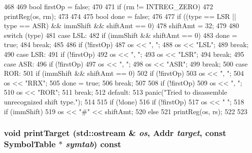\begin{DoxyCode}
468 {
469     bool firstOp = false;
470 
471     if (rm != INTREG_ZERO) {
472         printReg(os, rm);
473     }
474 
475     bool done = false;
476 
477     if ((type == LSR || type == ASR) && immShift && shiftAmt == 0)
478         shiftAmt = 32;
479 
480     switch (type) {
481       case LSL:
482         if (immShift && shiftAmt == 0) {
483             done = true;
484             break;
485         }
486         if (!firstOp)
487             os << ", ";
488         os << "LSL";
489         break;
490       case LSR:
491         if (!firstOp)
492             os << ", ";
493         os << "LSR";
494         break;
495       case ASR:
496         if (!firstOp)
497             os << ", ";
498         os << "ASR";
499         break;
500       case ROR:
501         if (immShift && shiftAmt == 0) {
502             if (!firstOp)
503                 os << ", ";
504             os << "RRX";
505             done = true;
506             break;
507         }
508         if (!firstOp)
509             os << ", ";
510         os << "ROR";
511         break;
512       default:
513         panic("Tried to disassemble unrecognized shift type.\n");
514     }
515     if (!done) {
516         if (!firstOp)
517             os << " ";
518         if (immShift)
519             os << "#" << shiftAmt;
520         else
521             printReg(os, rs);
522     }
523 }
\end{DoxyCode}
\hypertarget{classArmISA_1_1ArmStaticInst_ae7bcb973c05eaba610f0c9bcd5a613d7}{
\subsubsection[{printTarget}]{\setlength{\rightskip}{0pt plus 5cm}void printTarget (std::ostream \& {\em os}, \/  {\bf Addr} {\em target}, \/  const SymbolTable $\ast$ {\em symtab}) const}}
\label{classArmISA_1_1ArmStaticInst_ae7bcb973c05eaba610f0c9bcd5a613d7}




